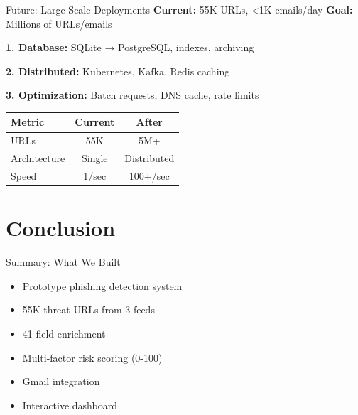 \documentclass[aspectratio=169]{beamer}
\begin{document}
\begin{frame}{Future: Large Scale Deployments}
\vspace*{-0.4cm}
\scriptsize
\textbf{Current:} 55K URLs, <1K emails/day \quad \textbf{Goal:} Millions of URLs/emails

\vspace{0.1cm}
\textbf{1. Database:} SQLite → PostgreSQL, indexes, archiving

\textbf{2. Distributed:} Kubernetes, Kafka, Redis caching

\textbf{3. Optimization:} Batch requests, DNS cache, rate limits

\vspace{0.1cm}
\begin{center}
\scriptsize
\begin{tabular}{lcc}
\toprule
\textbf{Metric} & \textbf{Current} & \textbf{After} \\
\midrule
URLs & 55K & 5M+ \\
Architecture & Single & Distributed \\
Speed & 1/sec & 100+/sec \\
\bottomrule
\end{tabular}
\end{center}
\end{frame}

\section{Conclusion}

\begin{frame}{Summary: What We Built}
\small
\begin{itemize}
    \item Prototype phishing detection system
    \item 55K threat URLs from 3 feeds
    \item 41-field enrichment
    \item Multi-factor risk scoring (0-100)
    \item Gmail integration
    \item Interactive dashboard
\end{itemize}
\end{frame}
\end{document}
